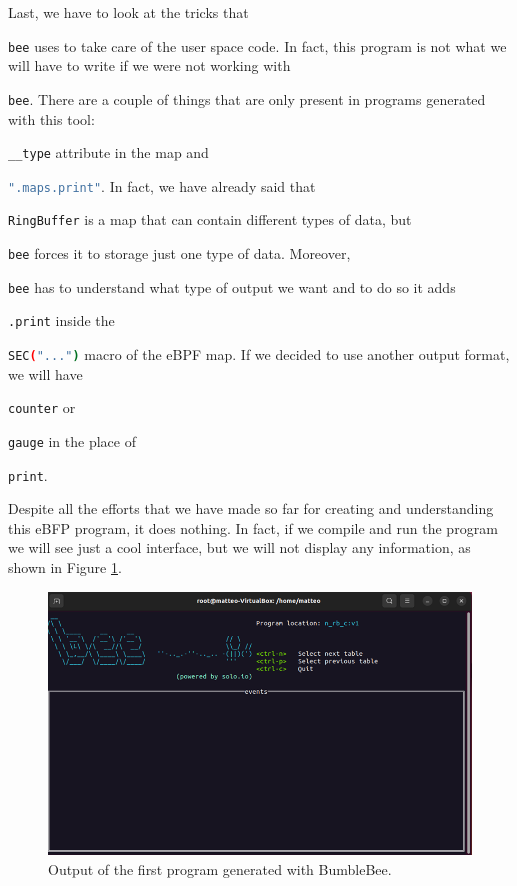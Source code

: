 Last, we have to look at the tricks that \raggedright\colorbox{backcolour}{\lstinline[style=commandline, language=bash]|bee|} uses to take care of the user space code.
In fact, this program is not what we will have to write if we were not working with \raggedright\colorbox{backcolour}{\lstinline[style=commandline, language=bash]|bee|}.
There are a couple of things that are only present in programs generated with this tool: \raggedright\colorbox{backcolour}{\lstinline[style=commandline, language=bash]|__type|} attribute in the map and \raggedright\colorbox{backcolour}{\lstinline[style=commandline, language=bash]|".maps.print"|}.
In fact, we have already said that \raggedright\colorbox{backcolour}{\lstinline[style=commandline, language=bash]|RingBuffer|} is a map that can contain different types of data, but \raggedright\colorbox{backcolour}{\lstinline[style=commandline, language=bash]|bee|} forces it to storage just one type of data.
Moreover, \raggedright\colorbox{backcolour}{\lstinline[style=commandline, language=bash]|bee|} has to understand what type of output we want and to do so it adds \raggedright\colorbox{backcolour}{\lstinline[style=commandline, language=bash]|.print|} inside the \raggedright\colorbox{backcolour}{\lstinline[style=commandline, language=bash]|SEC("...")|} macro of the eBPF map.
If we decided to use another output format, we will have \raggedright\colorbox{backcolour}{\lstinline[style=commandline, language=bash]|counter|} or \raggedright\colorbox{backcolour}{\lstinline[style=commandline, language=bash]|gauge|} in the place of \raggedright\colorbox{backcolour}{\lstinline[style=commandline, language=bash]|print|}.

Despite all the efforts that we have made so far for creating and understanding this eBFP program, it does nothing.
In fact, if we compile and run the program we will see just a cool interface, but we will not display any information, as shown in Figure \ref{fig:bee_first_program_output}.

\begin{figure}[h]
	\centering
	\includegraphics[width=0.7\linewidth]{images/LinuxDevelopment/n_rb_p_display.png}
	\caption{Output of the first program generated with BumbleBee.}
	\label{fig:bee_first_program_output}
\end{figure}

